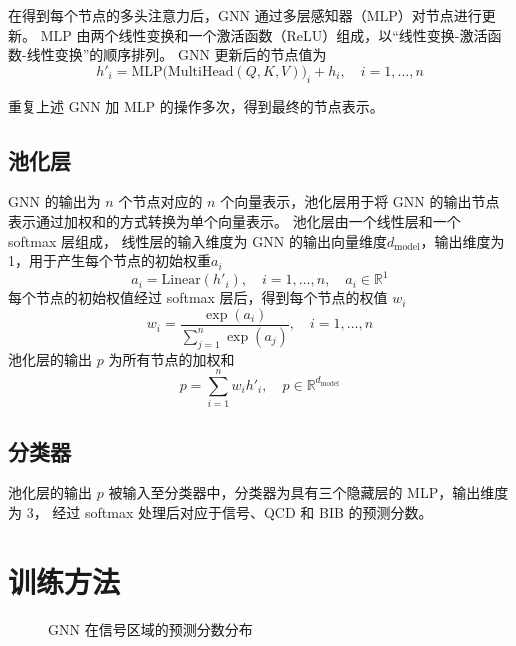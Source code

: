 在得到每个节点的多头注意力后，GNN 通过多层感知器（MLP）对节点进行更新。
MLP 由两个线性变换和一个激活函数（ReLU）组成，以“线性变换-激活函数-线性变换”的顺序排列。
GNN 更新后的节点值为
\begin{equation}
    h'_i = \mathrm{MLP}\bigl(\mathrm{MultiHead}(Q,K,V)\bigr)_i + h_i,
    \quad i=1,\dots,n
\end{equation}

重复上述 GNN 加 MLP 的操作多次，得到最终的节点表示。


\subsection{池化层}
GNN 的输出为 $n$ 个节点对应的 $n$ 个向量表示，池化层用于将 GNN 的输出节点表示通过加权和的方式转换为单个向量表示。
池化层由一个线性层和一个 softmax 层组成，
线性层的输入维度为 GNN 的输出向量维度$d_{\text{model}}$，输出维度为 1，用于产生每个节点的初始权重$a_i$
\begin{equation}
    a_i = \mathrm{Linear}(h'_i), \quad i=1,\dots,n,
    \quad a_i\in\mathbb{R}^1
\end{equation}
每个节点的初始权值经过 softmax 层后，得到每个节点的权值 $w_i$
\begin{equation}
    w_i = \frac{\exp(a_i)}{\sum_{j=1}^n \exp(a_j)}, \quad i=1,\dots,n
\end{equation}
池化层的输出 $p$ 为所有节点的加权和
\begin{equation}
    p = \sum_{i=1}^n w_i h'_i,
    \quad p\in\mathbb{R}^{d_{\text{model}}}
\end{equation}


\subsection{分类器}
池化层的输出 $p$ 被输入至分类器中，分类器为具有三个隐藏层的 MLP，输出维度为 3，
经过 softmax 处理后对应于信号、QCD 和 BIB 的预测分数。


\section{训练方法}
\begin{figure}[ht]
    \centering
    \hfill
    \hfill
    \caption{GNN 在信号区域的预测分数分布}
    \label{fig:GNN_before}
\end{figure}

